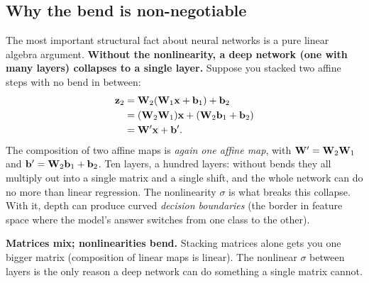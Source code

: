\subsection{Why the bend is non-negotiable}

The most important structural fact about neural networks is a pure linear algebra
argument. \textbf{Without the nonlinearity, a deep network (one with many layers)
collapses to a single layer.} Suppose you stacked two affine steps with no bend in between:
\begin{align*}
\mathbf{z}_2 &= \mathbf{W}_2(\mathbf{W}_1 \mathbf{x} + \mathbf{b}_1) + \mathbf{b}_2 \\
&= (\mathbf{W}_2\mathbf{W}_1)\mathbf{x} + (\mathbf{W}_2\mathbf{b}_1 + \mathbf{b}_2) \\
&= \mathbf{W}'\mathbf{x} + \mathbf{b}'.
\end{align*}
The composition of two affine maps is \emph{again one affine map}, with
$\mathbf{W}'=\mathbf{W}_2\mathbf{W}_1$ and $\mathbf{b}'=\mathbf{W}_2\mathbf{b}_1+\mathbf{b}_2$. Ten layers, a
hundred layers: without bends they all multiply out into a single matrix and a single
shift, and the whole network can do no more than linear regression. The nonlinearity
$\sigma$ is what breaks this collapse. With it, depth can produce curved
\emph{decision boundaries} (the border in feature space where the model's answer switches
from one class to the other).

\begin{focusbox}
\textbf{Matrices mix; nonlinearities bend.} Stacking matrices alone gets you one bigger
matrix (composition of linear maps is linear). The nonlinear $\sigma$ between layers is
the only reason a deep network can do something a single matrix cannot.
\end{focusbox}


